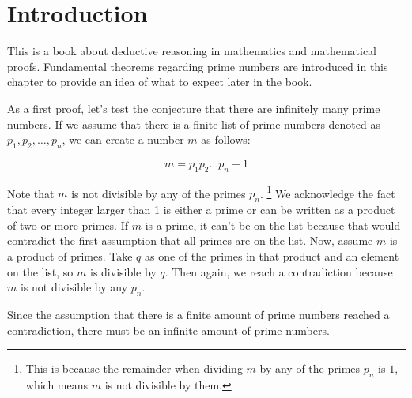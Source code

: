\chapter{Introduction}

This is a book about deductive reasoning in mathematics and mathematical proofs. 
Fundamental theorems regarding prime numbers are introduced in this chapter to provide an idea of what to expect later in the book.

As a first proof, let's test the conjecture that there are infinitely many prime numbers.
If we assume that there is a finite list of prime numbers denoted as $p_1, p_2, \ldots, p_n$, we can create a number $m$ as follows:

\[
m = p_1p_2 \ldots p_n + 1
\]

Note that $m$ is not divisible by any of the primes $p_n$.
\footnote{This is because the remainder when dividing $m$ by any of the primes $p_n$ is $1$, 
which means $m$ is not divisible by them.}
We acknowledge the fact that every integer larger than 1 is either a prime or can be written as a product of two or more primes. 
If $m$ is a prime, it can't be on the list because that would contradict the first assumption that all primes are on the list. 
Now, assume $m$ is a product of primes. 
Take $q$ as one of the primes in that product and an element on the list, so $m$ is divisible by $q$. 
Then again, we reach a contradiction because $m$ is not divisible by any $p_n$.

Since the assumption that there is a finite amount of prime numbers reached a contradiction, there must be an infinite amount of prime numbers.


